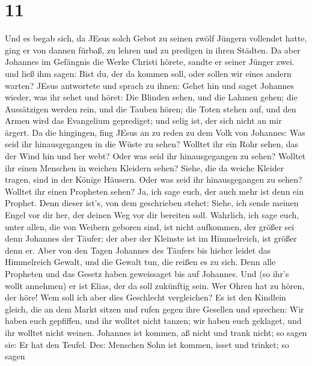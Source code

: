 \hypertarget{section-10}{%
\section{11}\label{section-10}}

 Und es begab sich, da JEsus solch Gebot zu seinen zwölf
Jüngern vollendet hatte, ging er von dannen fürbaß, zu lehren und zu
predigen in ihren Städten.  Da aber Johannes im Gefängnis
die Werke Christi hörete, sandte er seiner Jünger zwei.  und
ließ ihm sagen: Bist du, der da kommen soll, oder sollen wir eines
andern warten?  JEsus antwortete und sprach zu ihnen: Gehet
hin und saget Johannes wieder, was ihr sehet und höret:  Die
Blinden sehen, und die Lahmen gehen; die Aussätzigen werden rein, und
die Tauben hören; die Toten stehen auf, und den Armen wird das
Evangelium geprediget;  und selig ist, der sich nicht an mir
ärgert.  Da die hingingen, fing JEsus an zu reden zu dem
Volk von Johannes: Was seid ihr hinausgegangen in die Wüste zu sehen?
Wolltet ihr ein Rohr sehen, das der Wind hin und her webt? 
Oder was seid ihr hinausgegangen zu sehen? Wolltet ihr einen Menschen in
weichen Kleidern sehen? Siehe, die da weiche Kleider tragen, sind in der
Könige Häusern.  Oder was seid ihr hinausgegangen zu sehen?
Wolltet ihr einen Propheten sehen? Ja, ich sage euch, der auch mehr ist
denn ein Prophet.  Denn dieser ist's, von dem geschrieben
stehet: Siehe, ich sende meinen Engel vor dir her, der deinen Weg vor
dir bereiten soll.  Wahrlich, ich sage euch, unter allen,
die von Weibern geboren sind, ist nicht aufkommen, der größer sei denn
Johannes der Täufer; der aber der Kleinste ist im Himmelreich, ist
größer denn er.  Aber von den Tagen Johannes des Täufers
bis hieher leidet das Himmelreich Gewalt, und die Gewalt tun, die reißen
es zu sich.  Denn alle Propheten und das Gesetz haben
geweissaget bis auf Johannes.  Und (so ihr's wollt
annehmen) er ist Elias, der da soll zukünftig sein.  Wer
Ohren hat zu hören, der höre!  Wem soll ich aber dies
Geschlecht vergleichen? Es ist den Kindlein gleich, die an dem Markt
sitzen und rufen gegen ihre Gesellen  und sprechen: Wir
haben euch gepfiffen, und ihr wolltet nicht tanzen; wir haben euch
geklaget, und ihr wolltet nicht weinen.  Johannes ist
kommen, aß nicht und trank nicht; so sagen sie: Er hat den Teufel.
 Des: Menschen Sohn ist kommen, isset und trinket; so sagen
